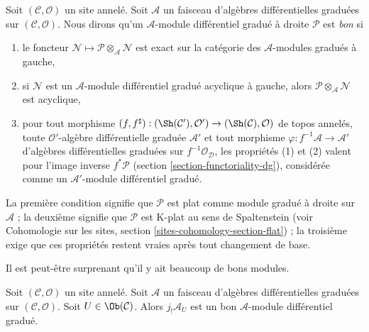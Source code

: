 \medskip\noindent
Soit $(\mathcal{C}, \mathcal{O})$ un site annelé. Soit
$\mathcal{A}$ un faisceau d'algèbres différentielles graduées sur
$(\mathcal{C}, \mathcal{O})$. Nous dirons qu'un
$\mathcal{A}$-module différentiel gradué à droite $\mathcal{P}$ est {\it bon}
si
\begin{enumerate}
\item le foncteur
$\mathcal{N} \mapsto \mathcal{P} \otimes_\mathcal{A} \mathcal{N}$ est
exact sur la catégorie des $\mathcal{A}$-modules gradués à gauche,
\item si $\mathcal{N}$ est un
$\mathcal{A}$-module différentiel gradué acyclique à gauche, alors
$\mathcal{P} \otimes_\mathcal{A} \mathcal{N}$ est acyclique,
\item pour tout morphisme $(f, f^\sharp) : (\Sh(\mathcal{C}'), \mathcal{O}')
\to (\Sh(\mathcal{C}), \mathcal{O})$ de topos
annelés, toute $\mathcal{O}'$-algèbre différentielle graduée
$\mathcal{A}'$ et tout morphisme $\varphi : f^{-1}\mathcal{A} \to \mathcal{A}'$ d'algèbres
différentielles graduées sur $f^{-1}\mathcal{O}_\mathcal{D}$, les propriétés
(1) et (2) valent pour l'image inverse $f^*\mathcal{P}$
(section \ref{section-functoriality-dg}),
considérée comme un $\mathcal{A}'$-module différentiel gradué.
\end{enumerate}
La première condition signifie que $\mathcal{P}$ est plat comme module gradué
à droite sur $\mathcal{A}$ ; la deuxième signifie que $\mathcal{P}$ est
K-plat au sens de Spaltenstein (voir Cohomologie
sur les sites, section \ref{sites-cohomology-section-flat}) ; la troisième
exige que ces propriétés restent vraies après tout changement de base.

\medskip\noindent Il
est peut-être surprenant qu'il y ait beaucoup de bons modules.

\begin{lemma}
\label{lemma-supply-good}
Soit $(\mathcal{C}, \mathcal{O})$ un site annelé. Soit
$\mathcal{A}$ un faisceau d'algèbres différentielles graduées
sur $(\mathcal{C}, \mathcal{O})$. Soit $U \in \Ob(\mathcal{C})$.
Alors $j_!\mathcal{A}_U$ est un bon
$\mathcal{A}$-module différentiel gradué.
\end{lemma}

